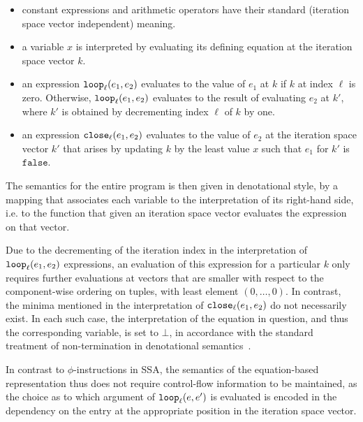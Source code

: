 \begin{itemize} 

\item 
constant expressions and arithmetic operators have their standard
(iteration space vector independent) meaning.

\item a variable $x$ is interpreted by evaluating its defining
equation at the iteration space vector $k$.

\item an expression $\mathtt{loop}_{{\ell}}({e_1},{e_2})$ evaluates to the value of
$e_1$ at $k$ if $k$ at index $\ell$ is zero. Otherwise, $\mathtt{loop}_{{\ell}}({e_1},{e_2})$ evaluates to the result of evaluating $e_2$ at $k'$,
where $k'$ is obtained by decrementing index $\ell$ of $k$ by one.

\item an expression $\mathtt{close}_{{\ell}}({e_1},{e_2})$ evaluates to the value
of $e_2$ at the iteration space vector $k'$ that arises by updating
$k$ by the least value $x$ such that $e_1$ for $k'$ is
$\mathtt{false}$.

\end{itemize}

The semantics for the entire program is then given in denotational
style, by a mapping that associates each variable to the
interpretation of its right-hand side, i.e. to the function that given
an iteration space vector evaluates the expression on that vector.

Due to the decrementing of the iteration index in the interpretation
of $\mathtt{loop}_{{\ell}}({e_1},{e_2})$ expressions, an evaluation of this
expression for a particular $k$ only requires further evaluations at
vectors that are smaller with respect to the component-wise ordering
on tuples, with least element $(0,\ldots,0)$. In contrast, the minima
mentioned in the interpretation of $\mathtt{close}_{{\ell}}({e_1},{e_2})$ do not necessarily exist. In each such case, the interpretation
of the equation in question, and thus the corresponding variable, is
set to $\bot$, in accordance with the standard treatment of
non-termination in denotational semantics~\cite{winskel_93_formal}.

In contrast to $\phi$-instructions in SSA, the semantics of the
equation-based representation thus does not require control-flow
information to be maintained, as the choice as to which argument of
$\mathtt{loop}_{{\ell}}({e},{e'})$ is evaluated is encoded in the dependency on
the entry at the appropriate position in the iteration space vector.

